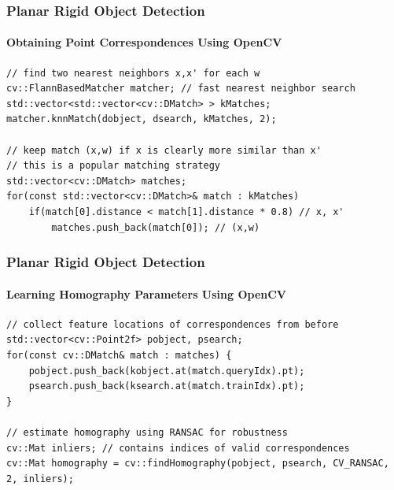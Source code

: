 \documentclass[xetex,professionalfont]{beamer}
\begin{document}
\begin{frame}[fragile]
\frametitle{Planar Rigid Object Detection}
\framesubtitle{Obtaining Point Correspondences Using OpenCV}

\footnotesize
\begin{verbatim}
// find two nearest neighbors x,x' for each w
cv::FlannBasedMatcher matcher; // fast nearest neighbor search
std::vector<std::vector<cv::DMatch> > kMatches;
matcher.knnMatch(dobject, dsearch, kMatches, 2);

// keep match (x,w) if x is clearly more similar than x'
// this is a popular matching strategy
std::vector<cv::DMatch> matches;
for(const std::vector<cv::DMatch>& match : kMatches)
    if(match[0].distance < match[1].distance * 0.8) // x, x'
        matches.push_back(match[0]); // (x,w)
\end{verbatim}

\end{frame}


\begin{frame}[fragile]
\frametitle{Planar Rigid Object Detection}
\framesubtitle{Learning Homography Parameters Using OpenCV}

\footnotesize
\begin{verbatim}
// collect feature locations of correspondences from before
std::vector<cv::Point2f> pobject, psearch;
for(const cv::DMatch& match : matches) { 
    pobject.push_back(kobject.at(match.queryIdx).pt);
    psearch.push_back(ksearch.at(match.trainIdx).pt);
}

// estimate homography using RANSAC for robustness
cv::Mat inliers; // contains indices of valid correspondences
cv::Mat homography = cv::findHomography(pobject, psearch, CV_RANSAC, 2, inliers);
\end{verbatim}

\end{frame}


{
\begin{frame}


\end{frame}
}
\end{document}
